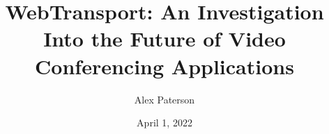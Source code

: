 \documentclass{l4proj}
\begin{document}
\title{WebTransport: An Investigation Into the Future of Video
Conferencing Applications} %
\author{Alex Paterson}
\date{April 1, 2022}

\maketitle











\end{document}
